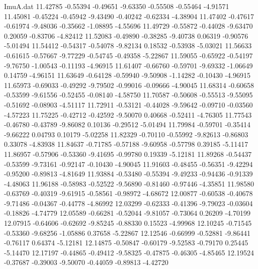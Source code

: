 \begin{filecontents}{ImuA.dat}
  11.42785   -0.55394   -0.49651   -9.63350   -0.55508   -0.55464   -4.91571
  11.45081   -0.45224   -0.45942   -9.43490   -0.40242   -0.62334   -4.38904
  11.47402   -0.47617   -0.61974   -9.48036   -0.35662   -1.08895   -4.55696
  11.49729   -0.55872   -0.44028   -9.63470    0.20059   -0.83706   -4.82412
  11.52083   -0.49890   -0.38285   -9.40738    0.06319   -0.90576   -5.01494
  11.54412   -0.54317   -0.54078   -9.82134    0.18532   -0.53938   -5.03021
  11.56633   -0.61615   -0.57667   -9.77229   -0.54745   -0.49358   -5.22867
  11.59055   -0.65922   -0.54197   -9.76750   -1.00543   -0.11193   -4.96915
  11.61407   -0.66760   -0.59701   -9.69332   -1.06649    0.14759   -4.96151
  11.63649   -0.64128   -0.59940   -9.50908   -1.14282   -0.10430   -4.96915
  11.65973   -0.69033   -0.49292   -9.79502   -0.99016   -0.09666   -4.90045
  11.68314   -0.60658   -0.53599   -9.61556   -0.52455   -0.08140   -4.58750
  11.70587   -0.50608   -0.55513   -9.55095   -0.51692   -0.08903   -4.51117
  11.72911   -0.53121   -0.44028   -9.59642   -0.09710   -0.03560   -4.57223
  11.75225   -0.42712   -0.42592   -9.50070    0.40668   -0.52411   -4.76305
  11.77543   -0.46780   -0.43789   -9.86082    0.10136   -0.29512   -5.01494
  11.79984   -0.59701   -0.35414   -9.66222    0.04793    0.10179   -5.02258
  11.82329   -0.70110   -0.55992   -9.82613   -0.86803    0.33078   -4.83938
  11.84637   -0.71785   -0.57188   -9.60958   -0.57798    0.39185   -5.11417
  11.86957   -0.57906   -0.53360   -9.41695   -0.99780    0.19339   -5.12181
  11.89268   -0.54437   -0.53599   -9.73161   -0.92147   -0.10430   -4.90045
  11.91603   -0.48455   -0.56351   -9.42294   -0.95200   -0.89813   -4.81649
  11.93884   -0.53480   -0.55394   -9.49233   -0.94436   -0.91339   -4.48063
  11.96188   -0.58983   -0.52522   -9.56890   -0.81460   -0.97446   -4.35851
  11.98580   -0.63769   -0.40319   -9.61915   -0.58561   -0.98972   -4.68672
  12.00877   -0.60538   -0.40678   -9.71486   -0.04367   -0.44778   -4.86992
  12.03299   -0.62333   -0.41396   -9.79023   -0.03604   -0.18826   -4.74779
  12.05589   -0.66281   -0.52044   -9.81057   -0.73064    0.26209   -4.70199
  12.07915   -0.64606   -0.62692   -9.85245   -0.88330    0.15523   -4.99968
  12.10245   -0.71545   -0.53360   -9.68256   -1.05886    0.37658   -5.22867
  12.12546   -0.66999   -0.52881   -9.86441   -0.76117    0.64374   -5.12181
  12.14875   -0.50847   -0.60179   -9.52583   -0.79170    0.25445   -5.14470
  12.17197   -0.44865   -0.49412   -9.58325   -0.47875   -0.46305   -4.85465
  12.19524   -0.37687   -0.39003   -9.50070   -0.44059   -0.89813   -4.42720

\end{filecontents}
